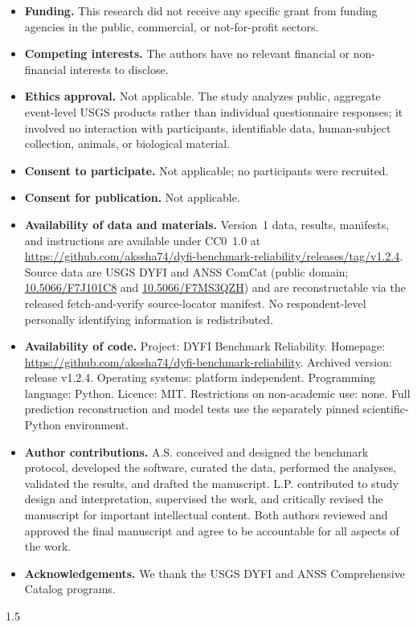 \documentclass[pdflatex,sn-basic,Numbered]{sn-jnl}
\begin{document}
\begin{itemize}\setlength{\itemsep}{2pt}\setlength{\parskip}{0pt}\setlength{\parsep}{0pt}
\item \textbf{Funding.} This research did not receive any specific grant from
funding agencies in the public, commercial, or not-for-profit sectors.
\item \textbf{Competing interests.} The authors have no relevant financial or
non-financial interests to disclose.
\item \textbf{Ethics approval.} Not applicable. The study analyzes public,
aggregate event-level USGS products rather than individual questionnaire
responses; it involved no interaction with participants, identifiable data,
human-subject collection, animals, or biological material.
\item \textbf{Consent to participate.} Not applicable; no participants were
recruited.
\item \textbf{Consent for publication.} Not applicable.
\item \textbf{Availability of data and materials.} Version~1 data, results, manifests, and
instructions are available under CC0~1.0 at
\url{https://github.com/akssha74/dyfi-benchmark-reliability/releases/tag/v1.2.4}.
Source data are USGS DYFI and ANSS ComCat (public domain;
\href{https://doi.org/10.5066/F7J101C8}{10.5066/F7J101C8} and
\href{https://doi.org/10.5066/F7MS3QZH}{10.5066/F7MS3QZH}) and are reconstructable
via the released fetch-and-verify source-locator manifest. No respondent-level
personally identifying information is redistributed.
\item \textbf{Availability of code.} Project: DYFI Benchmark Reliability.
Homepage: \url{https://github.com/akssha74/dyfi-benchmark-reliability}.
Archived version: release v1.2.4. Operating systems: platform independent.
Programming language: Python. Licence: MIT. Restrictions on non-academic use:
none. Full prediction reconstruction and model tests use the separately pinned
scientific-Python environment.
\item \textbf{Author contributions.} A.S. conceived and designed the benchmark
protocol, developed the software, curated the data, performed the analyses,
validated the results, and drafted the manuscript. L.P. contributed to study
design and interpretation, supervised the work, and critically revised the
manuscript for important intellectual content. Both authors reviewed and
approved the final manuscript and agree to be accountable for all aspects of the
work.
\item \textbf{Acknowledgements.} We thank the USGS DYFI and ANSS Comprehensive
Catalog programs.
\end{itemize}

\begin{spacing}{1.5}

\end{spacing}
\end{document}
